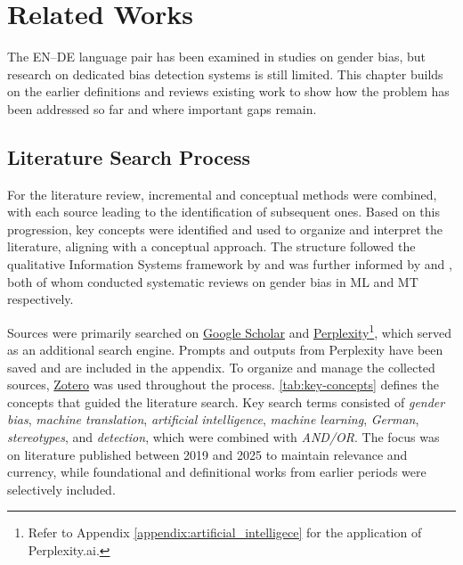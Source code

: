 \chapter{Related Works}
The EN–DE language pair has been examined in studies on gender bias, but research on dedicated bias detection systems is still limited. This chapter builds on the earlier definitions and reviews existing work to show how the problem has been addressed so far and where important gaps remain.

    \section{Literature Search Process}
        For the literature review, incremental and conceptual methods were combined, with each source leading to the identification of subsequent ones. Based on this progression, key concepts were identified and used to organize and interpret the literature, aligning with a conceptual approach. The structure followed the qualitative Information Systems framework by \textcite{schryenWritingQualitativeLiterature2015} and was further informed by \textcite{shresthaExploringGenderBiases2022} and \textcite{savoldiDecadeGenderBias2025}, both of whom conducted systematic reviews on gender bias in ML and MT respectively.

        Sources were primarily searched on \href{https://scholar.google.com/}{Google Scholar} and \href{https://www.perplexity.ai/}{Perplexity}\footnote{Refer to Appendix \ref{appendix:artificial_intelligece} for the application of Perplexity.ai.}, which served as an additional search engine. Prompts and outputs from Perplexity have been saved and are included in the appendix. To organize and manage the collected sources, \href{https://www.zotero.org/}{Zotero} was used throughout the process. \autoref{tab:key-concepts} defines the concepts that guided the literature search. Key search terms consisted of \textit{gender bias}, \textit{machine translation}, \textit{artificial intelligence}, \textit{machine learning}, \textit{German}, \textit{stereotypes}, and \textit{detection}, which were combined with \textit{AND/OR}. The focus was on literature published between 2019 and 2025 to maintain relevance and currency, while foundational and definitional works from earlier periods were selectively included.


